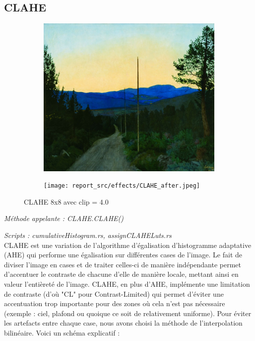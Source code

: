 \newpage

\subsection{CLAHE}

\begin{figure}[!h]
    \centering
    \begin{subfigure}[b]{0.4\textwidth}
        \includegraphics[width=1\textwidth]{report_src/effects/CLAHE_before.jpg}
    \end{subfigure}
    \begin{subfigure}[b]{0.4\textwidth}
        \texttt{[image: report\_src/effects/CLAHE\_after.jpeg]}
    \end{subfigure}
    \caption*{CLAHE 8x8 avec clip = 4.0}
\end{figure} 


\emph{Méthode appelante : CLAHE.CLAHE()}

\emph{Scripts : cumulativeHistogram.rs, assignCLAHELuts.rs} 
\\

CLAHE est une variation de l'algorithme d'égalisation d'histogramme adaptative (AHE) qui performe 
une égalisation sur différentes cases de l'image. Le fait de diviser l'image en cases et de traiter celles-ci 
de manière indépendante permet d'accentuer le contraste de chacune d'elle de manière locale, mettant ainsi en valeur l'entièreté de l'image.
CLAHE, en plus d'AHE, implémente une limitation de contraste (d'où "CL" pour Contrast-Limited) qui permet d'éviter une accentuation 
trop importante pour des zones où cela n'est pas nécessaire (exemple : ciel, plafond ou quoique ce soit de relativement uniforme).
Pour éviter les artefacts entre chaque case, nous avons choisi la méthode de l'interpolation bilinéaire. Voici un schéma explicatif :
\\

